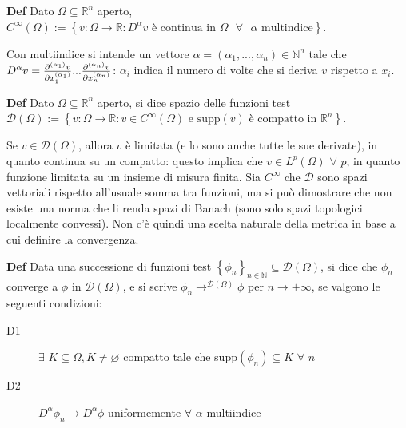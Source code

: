 \documentclass{article}
\begin{document}
\textbf{Def} Dato $\Omega \subseteq 
\mathbb{R}
^{n}$ aperto, $C^{\infty }\left( \Omega \right) :=\left\{ v:\Omega
\rightarrow 
\mathbb{R}
:D^{\alpha }v\text{ \`{e} continua in }\Omega \text{ }\forall \text{ }\alpha 
\text{ multindice}\right\} $.

Con multiindice si intende un vettore $\alpha =\left( \alpha _{1},...,\alpha
_{n}\right) \in 
\mathbb{N}
^{n}$ tale che $D^{\alpha }v=\frac{\partial ^{\left( \alpha _{1}\right) }v}{%
\partial x_{1}^{\left( \alpha _{1}\right) }}...\frac{\partial ^{\left(
\alpha _{n}\right) }v}{\partial x_{n}^{\left( \alpha _{n}\right) }}$: $%
\alpha _{i}$ indica il numero di volte che si deriva $v$ rispetto a $x_{i}$.

\textbf{Def} Dato $\Omega \subseteq 
\mathbb{R}
^{n}$ aperto, si dice spazio delle funzioni test $\mathcal{D}\left( \Omega
\right) :=\left\{ v:\Omega \rightarrow 
\mathbb{R}
:v\in C^{\infty }\left( \Omega \right) \text{ e supp}\left( v\right) \text{ 
\`{e} compatto in }%
\mathbb{R}
^{n}\right\} $.

Se $v\in \mathcal{D}\left( \Omega \right) $, allora $v$ \`{e} limitata (e lo
sono anche tutte le sue derivate), in quanto continua su un compatto: questo
implica che $v\in L^{p}\left( \Omega \right) $ $\forall $ $p$, in quanto
funzione limitata su un insieme di misura finita. Sia $C^{\infty }$ che $%
\mathcal{D}$ sono spazi vettoriali rispetto all'usuale somma tra funzioni,
ma si pu\`{o} dimostrare che non esiste una norma che li renda spazi di
Banach (sono solo spazi topologici localmente convessi). Non c'\`{e} quindi
una scelta naturale della metrica in base a cui definire la convergenza.

\textbf{Def} Data una successione di funzioni test $\left\{ \phi
_{n}\right\} _{n\in 
\mathbb{N}
}\subseteq \mathcal{D}\left( \Omega \right) $, si dice che $\phi _{n}$
converge a $\phi $ in $\mathcal{D}\left( \Omega \right) $, e si scrive $\phi
_{n}\rightarrow ^{\mathcal{D}\left( \Omega \right) }\phi $ per $n\rightarrow
+\infty $, se valgono le seguenti condizioni:

\begin{description}
\item[D1] $\exists $ $K\subseteq \Omega ,K\neq \varnothing $ compatto tale
che supp$\left( \phi _{n}\right) \subseteq K$ $\forall $ $n$

\item[D2] $D^{\alpha }\phi _{n}\rightarrow D^{\alpha }\phi $ uniformemente $%
\forall $ $\alpha $ multiindice
\end{description}
\end{document}
